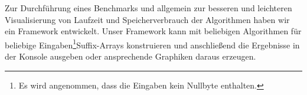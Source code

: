 Zur  Durchführung eines Benchmarks und allgemein zur besseren und leichteren
Visualisierung von Laufzeit und Speicherverbrauch der Algorithmen haben wir ein Framework entwickelt.
Unser Framework kann mit beliebigen Algorithmen für beliebige Eingaben\footnote{Es wird angenommen,
dass die Eingaben kein Nullbyte enthalten.}Suffix-Arrays konstruieren und
anschließend die Ergebnisse in der Konsole ausgeben oder ansprechende Graphiken daraus erzeugen.
